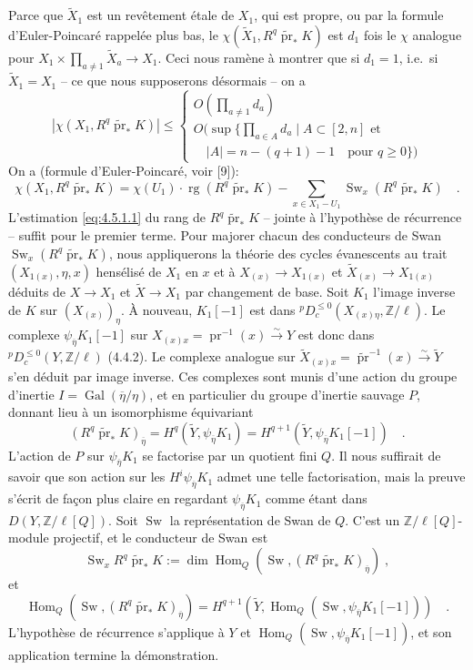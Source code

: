\documentclass[12pt,a4paper]{article}
\theoremstyle{plain}
\theoremstyle{definition}
\DeclareMathOperator{\Hom}{Hom}
\DeclareMathOperator{\Gal}{Gal}
\DeclareMathOperator{\rg}{rg}
\DeclareMathOperator{\Sw}{Sw}
\newcommand{\isom}{\xrightarrow{\sim}}
\providecommand{\Hom}{\operatorname{Hom}}
\providecommand{\Gal}{\operatorname{Gal}}
\providecommand{\pr}{\operatorname{pr}}
\begin{document}
Parce que $\tilde{X}_{1}$ est un rev\^{e}tement \'{e}tale de $X_{1}$, qui est propre, ou par la formule d'Euler-Poincar\'{e} rappel\'{e}e plus bas, le $\chi(\tilde{X}_{1}, R^{q}\tilde{\pr}_{*}K)$ est $d_{1}$ fois le $\chi$ analogue pour $X_{1} \times \prod_{a \neq 1} \tilde{X}_{a} \to X_{1}$. Ceci nous ram\`{e}ne \`{a} montrer que si $d_{1} = 1$, i.e.\ si $\tilde{X}_{1} = X_{1}$ -- ce que nous supposerons d\'{e}sormais -- on a
\[
|\chi(X_{1}, R^{q}\tilde{\pr}_{*}K)| \leq
\begin{cases}
O(\displaystyle\prod_{a \neq 1} d_{a}) \\[6pt]
O(\sup\{\displaystyle\prod_{a \in A} d_{a} \mid A \subset [2,n] \text{ et } \\[4pt]
\quad |A| = n-(q+1)-1 \quad \text{pour } q \geq 0\})
\end{cases}
\]
On a (formule d'Euler-Poincar\'{e}, voir [9]):
\[
\chi(X_{1}, R^{q}\tilde{\pr}_{*}K) = \chi(U_{1}) \cdot \rg(R^{q}\tilde{\pr}_{*}K) - \sum_{x \in X_{1}-U_{1}} \Sw_{x}(R^{q}\tilde{\pr}_{*}K)\quad.
\]
L'estimation \eqref{eq:4.5.1.1} du rang de $R^{q}\tilde{\pr}_{*}K$ -- jointe \`{a} l'hypoth\`{e}se de r\'{e}currence -- suffit pour le premier terme. Pour majorer chacun des conducteurs de Swan $\Sw_{x}(R^{q}\tilde{\pr}_{*}K)$, nous appliquerons la th\'{e}orie des cycles \'{e}vanescents au trait $(X_{1(x)}, \eta, x)$ hens\'{e}lis\'{e} de $X_{1}$ en $x$ et \`{a} $X_{(x)} \to X_{1(x)}$ et $\tilde{X}_{(x)} \to X_{1(x)}$ d\'{e}duits de $X \to X_{1}$ et $\tilde{X} \to X_{1}$ par changement de base. Soit $K_{1}$ l'image inverse de $K$ sur $(X_{(x)})_{\eta}$. \`{A} nouveau, $K_{1}[-1]$ est dans ${}^{p}D_{c}^{\leq 0}(X_{(x)\eta}, \mathbb{Z}/\ell)$. Le complexe $\psi_{\overline{\eta}}K_{1}[-1]$ sur $X_{(x)x} = \pr^{-1}(x) \isom Y$ est donc dans ${}^{p}D_{c}^{\leq 0}(Y, \mathbb{Z}/\ell)$ (4.4.2). Le complexe analogue sur $\tilde{X}_{(x)x} = \tilde{\pr}^{-1}(x) \isom \tilde{Y}$ s'en d\'{e}duit par image inverse. Ces complexes sont munis d'une action du groupe d'inertie $I = \Gal(\overline{\eta}/\eta)$, et en particulier du groupe d'inertie sauvage $P$, donnant lieu \`{a} un isomorphisme \'{e}quivariant
\[
(R^{q}\tilde{\pr}_{*}K)_{\overline{\eta}} = H^{q}(\tilde{Y}, \psi_{\overline{\eta}}K_{1}) = H^{q+1}(\tilde{Y}, \psi_{\overline{\eta}}K_{1}[-1])\quad.
\]
L'action de $P$ sur $\psi_{\overline{\eta}}K_{1}$ se factorise par un quotient fini $Q$. Il nous suffirait de savoir que son action sur les $H^{i}\psi_{\overline{\eta}}K_{1}$ admet une telle factorisation, mais la preuve s'\'{e}crit de fa\c{c}on plus claire en regardant $\psi_{\overline{\eta}}K_{1}$ comme \'{e}tant dans $D(Y, \mathbb{Z}/\ell[Q])$. Soit $\Sw$ la repr\'{e}sentation de Swan de $Q$. C'est un $\mathbb{Z}/\ell[Q]$-module projectif, et le conducteur de Swan est
\[
\Sw_{x} R^{q}\tilde{\pr}_{*}K := \dim \Hom_{Q}(\Sw, (R^{q}\tilde{\pr}_{*}K)_{\overline{\eta}})\;,
\]
et
\[
\Hom_{Q}(\Sw, (R^{q}\tilde{\pr}_{*}K)_{\overline{\eta}}) = H^{q+1}(\tilde{Y}, \Hom_{Q}(\Sw, \psi_{\overline{\eta}}K_{1}[-1]))\quad.
\]
L'hypoth\`{e}se de r\'{e}currence s'applique \`{a} $Y$ et $\Hom_{Q}(\Sw, \psi_{\overline{\eta}}K_{1}[-1])$, et son application termine la d\'{e}monstration.
\end{document}

